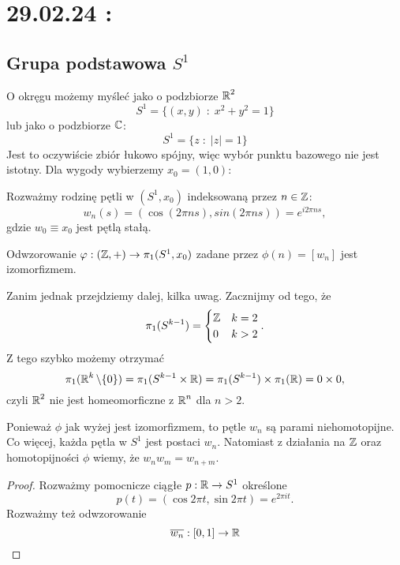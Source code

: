\section{29.02.24 : }

\subsection{Grupa podstawowa $S^1$}

O okręgu możemy myśleć jako o podzbiorze $\operatorname{\mathbb{R}}^2$
$$S^1=\{(x, y)\;:\;x^2+y^2=1\}$$
lub jako o podzbiorze $\operatorname{\mathbb{C}}$:
$$S^1=\{z\;:\;|z|=1\}$$
Jest to oczywiście zbiór łukowo spójny, więc wybór punktu bazowego nie jest istotny. Dla wygody wybierzemy $x_0=(1, 0)$:
\begin{center}
\end{center}
Rozważmy rodzinę pętli w $(S^1, x_0)$ indeksowaną przez $n\in\operatorname{\mathbb{Z}}$:
$$w_n(s)=(\cos(2\pi ns),sin(2\pi ns))=e^{i2\pi ns},$$
gdzie $w_0\equiv x_0$ jest pętlą stałą.

\begin{theorem}
  Odwzorowanie $\varphi:(\operatorname{\mathbb{Z}}, +)\to \pi_1(S^1, x_0)$ zadane przez $\phi(n)=[w_n]$ jest izomorfizmem.
\end{theorem}

Zanim jednak przejdziemy dalej, kilka uwag. Zacznijmy od tego, że 
$$\pi_1(S^{k-1})=\begin{cases}\operatorname{\mathbb{Z}}&k=2\\ 0&k>2\end{cases}.$$
Z tego szybko możemy otrzymać
$$\pi_1(\operatorname{\mathbb{R}}^k\setminus \{0\})=\pi_1(S^{k-1}\times \operatorname{\mathbb{R}})=\pi_1(S^{k-1})\times\pi_1(\operatorname{\mathbb{R}})=0\times 0,$$
czyli $\operatorname{\mathbb{R}}^2$ nie jest homeomorficzne z $\operatorname{\mathbb{R}}^n$ dla $n>2$.

Ponieważ $\phi$ jak wyżej jest izomorfizmem, to pętle $w_n$ są parami niehomotopijne. Co więcej, każda pętla w $S^1$ jest postaci $w_n$. Natomiast z działania na $\operatorname{\mathbb{Z}}$ oraz homotopijności $\phi$ wiemy, że $w_nw_m=w_{n+m}$.

\begin{proof}
  Rozważmy pomocnicze ciągłe $p:\operatorname{\mathbb{R}}\to S^1$ określone 
  $$p(t)=(\cos2\pi t, \sin 2\pi t)=e^{2\pi it}.$$
  Rozważmy też odwzorowanie 
  $$\overline{w_n}:[0,1]\to \operatorname{\mathbb{R}}$$
\end{proof}
